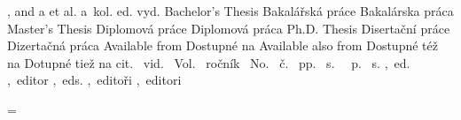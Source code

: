 \ifx\upper\undefined 
   \ifx\sc\undefined \def\upper{\uppercase\expandafter}\else {}\fi
\fi


            {, and }               { a }               {}
           { et al.}              { a~kol.}           {}
        { ed.}                 { vyd.}             {}
     {Bachelor's Thesis}    {Bakalářská práce}  {Bakalárska práca}
      {Master's Thesis}      {Diplomová práce}   {Diplomová práca}
      {Ph.D. Thesis}         {Disertační práce}  {Dizertačná práca}
      {Available from }      {Dostupné na }      {}
  {Available also from } {Dostupné též na }  {Dotupné tiež na }
       {cit.~}                {vid.~}             {}
         {Vol.~}                {ročník~}           {}
         {No.~}                 {č.~}               {}
       {pp.~}                 {s.~}               {}
      {~p.}                  {~s.}               {}
         {,~ed.}                {,~editor}          {}
        {,~eds.}               {,~editoři}         {,~editori}


\def\bibconjunctionand{\Mtext{bib.and}}
\def\preurl{\Mtext{bib.available}}
\let\predoi=\preurl
\def\postedition{\mtext{bib.edition}}
\def\Inclause{In:~}
\def\prevolume{\mtext{bib.volume}}
\def\prenumber{\mtext{bib.number}}
\def\prepages{\mtext{bib.prepages}}
\def\posteditor{\ifnum0\namecountraw>1 \Mtext{bib.editors}\else\Mtext{bib.editor}\fi}


\chardef\documentlanguage=\language
\def\Mtext#1{\csname mt:#1:\csname lan:\the\documentlanguage\endcsname\endcsname}

\def\setlang#1{\ifx#1\empty \else 
      \expandafter \ifx \csname #1Patt\endcsname \relax
         \opwarning{The language "#1" used in .bib file is unknown}
      \else \language=\csname #1Patt\endcsname
   \fi\fi
}
\ifx\USenglish\undefined  \chardef{} \fi
\let\enPatt=\USenglish  \let\usPatt=\USenglish
\ifx\csPatt \undefined \let\csPatt=\czPatt \else \let\czPatt=\csPatt \fi



